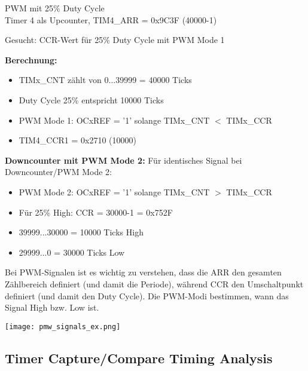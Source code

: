 \multend


\begin{example2}{PWM mit 25\% Duty Cycle}\\
    Timer 4 als Upcounter, TIM4\_ARR = 0x9C3F (40000-1)
    
    Gesucht: CCR-Wert für 25\% Duty Cycle mit PWM Mode 1
    
    \tcblower
    
    \textbf{Berechnung:}
    \begin{itemize}
        \item TIMx\_CNT zählt von 0...39999 = 40000 Ticks
        \item Duty Cycle 25\% entspricht 10000 Ticks
        \item PWM Mode 1: OCxREF = '1' solange TIMx\_CNT $<$ TIMx\_CCR
        \item TIM4\_CCR1 = 0x2710 (10000)
    \end{itemize}
    
    \textbf{Downcounter mit PWM Mode 2:}
    Für identisches Signal bei Downcounter/PWM Mode 2:
    \begin{itemize}
        \item PWM Mode 2: OCxREF = '1' solange TIMx\_CNT $>$ TIMx\_CCR
        \item Für 25\% High: CCR = 30000-1 = 0x752F
        \item 39999...30000 = 10000 Ticks High
        \item 29999...0 = 30000 Ticks Low
    \end{itemize}
\end{example2}

\begin{remark}
    Bei PWM-Signalen ist es wichtig zu verstehen, dass die ARR den gesamten Zählbereich definiert (und damit die Periode), während CCR den Umschaltpunkt definiert (und damit den Duty Cycle). Die PWM-Modi bestimmen, wann das Signal High bzw. Low ist.
\end{remark}

\texttt{[image: pmw\_signals\_ex.png]}



\multend

\subsection{Timer Capture/Compare Timing Analysis}


